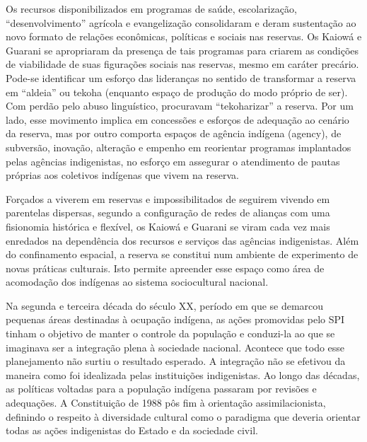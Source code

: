\documentclass{article}
\begin{document}
Os recursos disponibilizados em programas de sa\'ude,
escolariza\c{c}\~ao,
{\textquotedblleft}desenvolvimento{\textquotedblright} agr\'icola e
evangeliza\c{c}\~ao consolidaram e deram sustenta\c{c}\~ao ao novo
formato de rela\c{c}\~oes econ\^omicas, pol\'iticas e sociais nas
reservas. Os Kaiow\'a e Guarani se apropriaram da presen\c{c}a de tais
programas para criarem as condi\c{c}\~oes de viabilidade de suas
figura\c{c}\~oes sociais nas reservas, mesmo em car\'ater prec\'ario.
Pode-se identificar um esfor\c{c}o das lideran\c{c}as no sentido de
transformar a reserva em {\textquotedblleft}aldeia{\textquotedblright}
ou tekoha (enquanto espa\c{c}o de produ\c{c}\~ao do modo pr\'oprio de
ser). Com perd\~ao pelo abuso lingu\'istico, procuravam
{\textquotedblleft}tekoharizar{\textquotedblright} a reserva. Por um
lado, esse movimento implica em concess\~oes e esfor\c{c}os de
adequa\c{c}\~ao ao cen\'ario da reserva, mas por outro comporta
espa\c{c}os de ag\^encia ind\'igena (agency), de subvers\~ao,
inova\c{c}\~ao, altera\c{c}\~ao e empenho em reorientar programas
implantados pelas ag\^encias indigenistas, no esfor\c{c}o em assegurar
o atendimento de pautas pr\'oprias aos coletivos ind\'igenas que vivem
na reserva.  

For\c{c}ados a viverem em reservas e impossibilitados de seguirem
vivendo em parentelas dispersas, segundo a configura\c{c}\~ao de redes
de alian\c{c}as com uma fisionomia hist\'orica e flex\'ivel, os
Kaiow\'a e Guarani se viram cada vez mais enredados na depend\^encia
dos recursos e servi\c{c}os das ag\^encias indigenistas. Al\'em do
confinamento espacial, a reserva se constitui num ambiente de
experimento de novas pr\'aticas culturais. Isto permite apreender esse
espa\c{c}o como \'area de acomoda\c{c}\~ao dos ind\'igenas ao sistema
sociocultural nacional.

Na segunda e terceira d\'ecada do s\'eculo XX, per\'iodo em que se
demarcou pequenas \'areas destinadas \`a ocupa\c{c}\~ao ind\'igena, as
a\c{c}\~oes promovidas pelo SPI tinham o objetivo de manter o controle
da popula\c{c}\~ao e conduzi-la ao que se imaginava ser a
integra\c{c}\~ao plena \`a sociedade nacional. Acontece que todo esse
planejamento n\~ao surtiu o resultado esperado. A integra\c{c}\~ao
n\~ao se efetivou da maneira como foi idealizada pelas
institui\c{c}\~oes indigenistas. Ao longo das d\'ecadas, as pol\'iticas
voltadas para a popula\c{c}\~ao ind\'igena passaram por revis\~oes e
adequa\c{c}\~oes. A Constitui\c{c}\~ao de 1988 p\^os fim \`a
orienta\c{c}\~ao assimilacionista, definindo o respeito \`a diversidade
cultural como o paradigma que deveria orientar todas as a\c{c}\~oes
indigenistas do Estado e da sociedade civil. 
\end{document}

